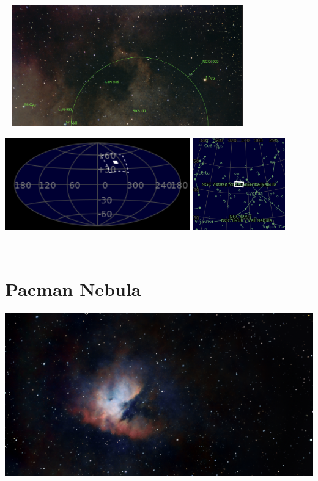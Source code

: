 \begin{center}
 \ \newpage
\includegraphics[width=0.75\textwidth]{../Imaging//Annotated/Northamerica_Nebula_Annotated.jpg}

\includegraphics[height=4cm]{../Imaging//Annotated/Northamerica_Nebula_Globe.jpg}
\includegraphics[height=4cm]{../Imaging//Annotated/Northamerica_Nebula_Close.jpg}
\end{center}
\ \\\section{Pacman Nebula}
\includegraphics[width=\textwidth]{../Imaging//Original/Pacman_Nebula.jpg}
